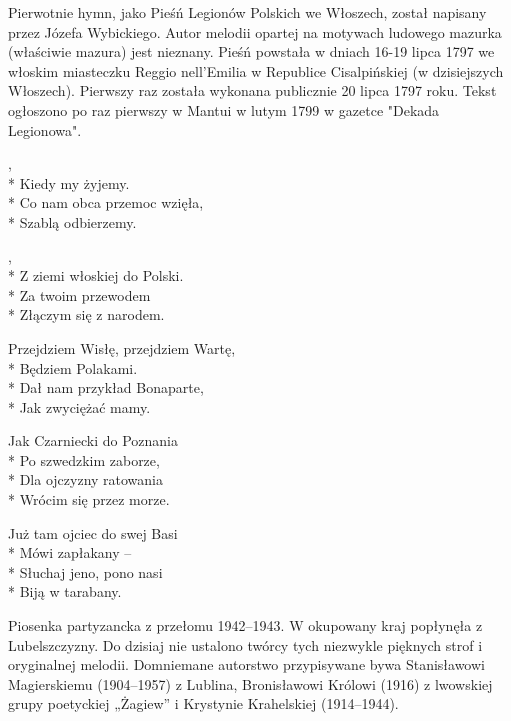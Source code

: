 \begin{info}Pierwotnie hymn, jako Pieśń Legionów Polskich we Włoszech, został napisany przez Józefa Wybickiego. Autor melodii opartej na motywach ludowego mazurka (właściwie mazura) jest nieznany. Pieśń powstała w dniach 16-19 lipca 1797 we włoskim miasteczku Reggio nell'Emilia w Republice Cisalpińskiej (w dzisiejszych Włoszech). Pierwszy raz została wykonana publicznie 20 lipca 1797 roku. Tekst ogłoszono po raz pierwszy w Mantui w lutym 1799 w gazetce "Dekada Legionowa".\end{info}

\begin{lyrics}[longestline={Przejdziem Wisłę, przejdziem Wartę,}]

,\\*
Kiedy my żyjemy.\\*
Co nam obca przemoc wzięła,\\*
Szablą odbierzemy.

\begin{chorus}
,\\*
Z ziemi włoskiej do Polski.\\*
Za twoim przewodem\\*
Złączym się z narodem.
\end{chorus}

Przejdziem Wisłę, przejdziem Wartę,\\*
Będziem Polakami.\\*
Dał nam przykład Bonaparte,\\*
Jak zwyciężać mamy.

\chorusref

Jak Czarniecki do Poznania\\*
Po szwedzkim zaborze,\\*
Dla ojczyzny ratowania\\*
Wrócim się przez morze.

\chorusref

Już tam ojciec do swej Basi\\*
Mówi zapłakany --\\*
Słuchaj jeno, pono nasi\\*
Biją w tarabany.

\chorusref
\end{lyrics}



\begin{info}Piosenka partyzancka z przełomu 1942–1943. W okupowany kraj popłynęła z Lubelszczyzny. Do dzisiaj nie ustalono twórcy tych niezwykle pięknych strof i oryginalnej melodii. Domniemane autorstwo przypisywane bywa Stanisławowi Magierskiemu (1904–1957) z Lublina, Bronisławowi Królowi (1916) z lwowskiej grupy poetyckiej „Żagiew” i Krystynie Krahelskiej (1914–1944).\end{info}

